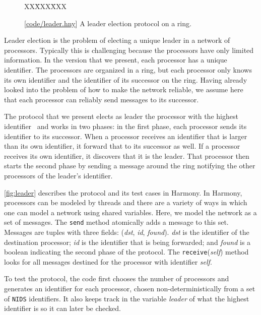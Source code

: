 \documentclass{report}
\newcommand{\harmonysource}[1]{
\begin{tabbing}
XX\=XXX\=XXX\kill
    
\end{tabbing}
}
\newcommand{\harmonylink}[1]{%
[\href{https://harmony.cs.cornell.edu/#1}{\underline{#1}}]%
}
\newenvironment{code}{
\tcolorbox
}{
\endtcolorbox
}
\begin{document}
\begin{figure}
\begin{code}
\harmonysource{leader}
\end{code}
\caption{\harmonylink{code/leader.hny} A leader election protocol on a ring.}
\label{fig:leader}
\end{figure}

Leader election is the problem of electing a unique leader in a
network of processors.  Typically this is challenging because the
processors have only limited information.  In the version that we
present, each processor has a unique identifier.  The processors
are organized in a ring, but each processor only knows its own
identifier and the identifier of its successor on the ring.  Having
already looked into the problem of how to make the network reliable,
we assume here that each processor can reliably send messages to
its successor.

The protocol that we present elects as leader the processor with the
highest identifier~\cite{CR79} and works in two phases: in the first
phase, each processor sends its identifier to its successor.  When
a processor receives an identifier that is larger than its own
identifier, it forward that to its successor as well.  If a processor
receives its own identifier, it discovers that it is the leader.  That
processor then starts the second phase by sending a message around the
ring notifying the other processors of the leader's identifier.

\autoref{fig:leader} describes the protocol and its test cases in Harmony.
In Harmony, processors can be modeled by threads and there are a variety of ways in
which one can model a network using shared variables.
Here, we model the network as a set of messages.
The \texttt{send} method atomically adds a message to this set.
Messages are tuples with three fields:
(\textit{dst}, \textit{id}, \textit{found}).
\textit{dst} is the identifier of the destination processor;
\textit{id} is the identifier that is being forwarded; and
\textit{found} is a boolean indicating the second phase of the protocol.
The \texttt{receive}(\textit{self}) method looks for all messages
destined for the processor with identifier \textit{self}.

To test the protocol, the code first chooses the number of processors
and generates an identifier for each
processor, chosen non-deterministically from a set of \texttt{NIDS}
identifiers.  It also keeps track in the variable \textit{leader} of
what the highest identifier is so it can later be checked.
\end{document}
